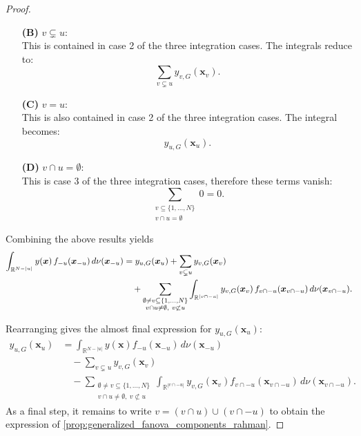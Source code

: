 \begin{proof}
\begin{itemize}
  \item[\textbf{(B)}] \( v \subsetneq u \): \\
  This is contained in case 2 of the three integration cases. The integrals reduce to:
  \[
  \sum_{v \subsetneq u} y_{v,G}(\boldsymbol{x}_v).
  \]

  \item[\textbf{(C)}] \( v = u \): \\
  This is also contained in case 2 of the three integration cases. The integral becomes:
  \[
  y_{u,G}(\boldsymbol{x}_u).
  \]

  \item[\textbf{(D)}] \( v \cap u = \emptyset \): \\
  This is case 3 of the three integration cases, therefore these terms vanish:
  \[
  \sum_{\substack{v \subseteq \{1,\dots,N\} \\ v \cap u = \emptyset}} 0 = 0.
  \]
\end{itemize}
Combining the above results yields
\begin{align*}
\int_{\mathbb{R}^{N - |u|}} 
    y(\boldsymbol{x})\, f_{-u}(\boldsymbol{x}_{-u}) 
    \, d\nu(\boldsymbol{x}_{-u})
&= y_{u,G}(\boldsymbol{x}_u)
   + \sum_{v \subsetneq u} y_{v,G}(\boldsymbol{x}_v) \notag\\
&\quad
   + \sum_{\substack{\emptyset \ne v \subseteq \{1,\dots,N\}\\
                     v \cap u \ne \emptyset,\ v \not\subset u}} 
     \int_{\mathbb{R}^{|v \cap -u|}} 
        y_{v,G}(\boldsymbol{x}_v)\,
        f_{v \cap -u}(\boldsymbol{x}_{v \cap -u}) 
        \, d\nu(\boldsymbol{x}_{v \cap -u}).
\end{align*}

Rearranging gives the almost final expression for \( y_{u,G}(\boldsymbol{x}_u) \):
\[
\begin{aligned}
y_{u,G}(\boldsymbol{x}_u)
&= 
\int_{\mathbb{R}^{N - |u|}} 
    y(\boldsymbol{x}) 
    f_{-u}(\boldsymbol{x}_{-u}) 
    \, d \nu(\boldsymbol{x}_{-u})
\\[0.5em]
&\quad
- \sum_{v \subsetneq u} 
    y_{v,G}(\boldsymbol{x}_v)
\\[0.5em]
&\quad
- \sum_{\substack{\emptyset \ne v \subseteq \{1,\dots,N\}\\
                    v \cap u \ne \emptyset,\ v \not\subset u}}
    \int_{\mathbb{R}^{|v \cap -u|}} 
        y_{v,G}(\boldsymbol{x}_v) 
        f_{v \cap -u}(\boldsymbol{x}_{v \cap -u}) 
        \, d \nu(\boldsymbol{x}_{v \cap -u}).
\end{aligned}
\]
As a final step, it remains to write \( v = (v \cap u) \cup (v \cap -u) \) to obtain the expression of \autoref{prop:generalized_fanova_components_rahman}.
\end{proof}

